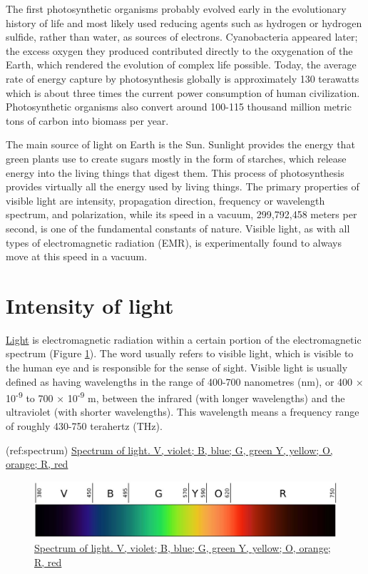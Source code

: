The first photosynthetic organisms probably evolved early in the
evolutionary history of life and most likely used reducing agents such
as hydrogen or hydrogen sulfide, rather than water, as sources of
electrons. Cyanobacteria appeared later; the excess oxygen they produced
contributed directly to the oxygenation of the Earth, which rendered the
evolution of complex life possible. Today, the average rate of energy
capture by photosynthesis globally is approximately 130 terawatts which
is about three times the current power consumption of human
civilization. Photosynthetic organisms also convert around 100-115
thousand million metric tons of carbon into biomass per year.

The main source of light on Earth is the Sun. Sunlight provides the
energy that green plants use to create sugars mostly in the form of
starches, which release energy into the living things that digest them.
This process of photosynthesis provides virtually all the energy used by
living things. The primary properties of visible light are intensity,
propagation direction, frequency or wavelength spectrum, and
polarization, while its speed in a vacuum, 299,792,458 meters per
second, is one of the fundamental constants of nature. Visible light, as
with all types of electromagnetic radiation (EMR), is experimentally
found to always move at this speed in a vacuum.

\section{Intensity of light}\label{intensity-of-light}

\href{https://en.wikipedia.org/wiki/Light}{Light} is electromagnetic
radiation within a certain portion of the electromagnetic spectrum
(Figure \ref{fig:spectrum}). The word usually refers to visible light,
which is visible to the human eye and is responsible for the sense of
sight. Visible light is usually defined as having wavelengths in the
range of 400-700 nanometres (nm), or 400 × 10\textsuperscript{-9} to 700
× 10\textsuperscript{-9} m, between the infrared (with longer
wavelengths) and the ultraviolet (with shorter wavelengths). This
wavelength means a frequency range of roughly 430-750 terahertz (THz).

(ref:spectrum)
\href{https://commons.wikimedia.org/wiki/File:Linear_visible_spectrum.svg}{Spectrum
of light. V, violet; B, blue; G, green Y, yellow; O, orange; R, red}

\begin{figure}

{\centering \includegraphics[width=0.7\linewidth]{./figures/photosynthesis/spectrum}

}

\caption{\href{https://commons.wikimedia.org/wiki/File:Linear_visible_spectrum.svg}{Spectrum
of light. V, violet; B, blue; G, green Y, yellow; O, orange; R, red}}\label{fig:spectrum}
\end{figure}

